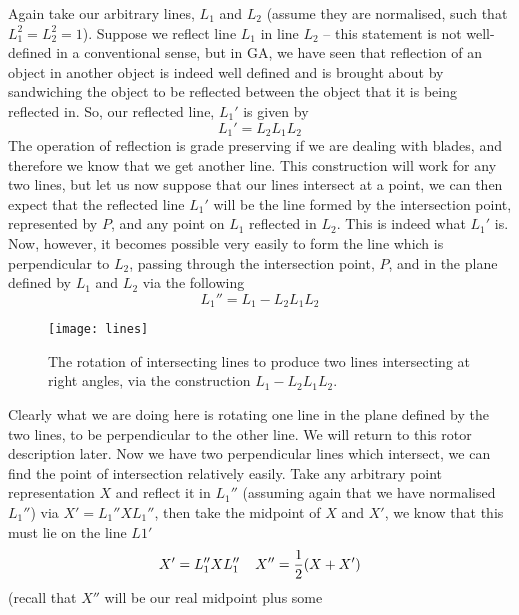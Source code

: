 Again take our arbitrary lines, $L_1$ and $L_2$ (assume
they are normalised, such that $L_1^2=L_2^2=1$). Suppose
we reflect line $L_1$ in line $L_2$ -- this statement is
not well-defined in a conventional sense, but in
GA, we have seen that reflection of an
object in another object is indeed well defined and is
brought about by sandwiching the object to be reflected
between the object that it is being reflected in. So, our
reflected line, $L_1'$ is given by
%
\[  L_1' = L_2L_1L_2  \]
%
The operation of reflection is grade preserving if we are
dealing with blades, and therefore we know that we get
another line. This construction will work for any two
lines, but let us now suppose that our lines intersect at
a point, we can then expect that the reflected line
$L_1'$ will be the line formed by the intersection point,
represented by $P$, and any point on $L_1$ reflected in $L_2$. This is
indeed what $L_1'$ is. Now, however, it becomes possible
very easily to form the line which is perpendicular to
$L_2$, passing through the intersection point, $P$, and
in the plane defined by $L_1$ and $L_2$ via the following
%
\begin{equation}
 L_1'' =  L_1 - L_2L_1L_2
\end{equation}
%
%
%
\begin{figure}
\centerline{
\texttt{[image: lines]}
} \caption{The rotation of intersecting lines to
produce two lines intersecting at right angles, via the
construction $L_1-L_2L_1L_2$.} \label{intersect_lines}
\end{figure}
Clearly what we are doing here is rotating one line in
the plane defined by the two lines,  to be perpendicular
to the other line. We will return to this rotor
description later.  Now we have two perpendicular lines
which intersect, we can find the point of intersection
relatively easily. Take any arbitrary point representation $X$ and
reflect it in $L_1''$ (assuming again that we have
normalised $L_1''$) via $X' = L_1''XL_1''$, then take the
midpoint of $X$ and $X'$, we know that this must lie on
the line $L1'$
%
\[ X' = L_1''XL_1'' \;\;\;\; X'' = \frac{1}{2} (X + X')   \]
%
(recall that $X''$ will be our real midpoint plus some

